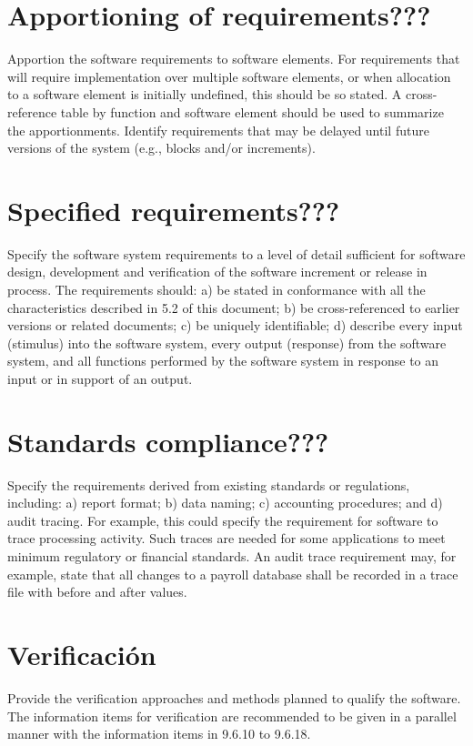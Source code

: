 \documentclass[12pt, a4paper, twoside]{article}
\begin{document}
 \section{Apportioning of requirements???}
 Apportion the software requirements to software elements. For requirements that will require
 implementation over multiple software elements, or when allocation to a software element is initially
 undefined, this should be so stated. A cross-reference table by function and software element should be
 used to summarize the apportionments.
 Identify requirements that may be delayed until future versions of the system (e.g., blocks and/or
 increments).

 \section{Specified requirements???}
 Specify the software system requirements to a level of detail sufficient for software design, development
 and verification of the software increment or release in process.
 The requirements should:
 a) be stated in conformance with all the characteristics described in 5.2 of this document;
 b) be cross-referenced to earlier versions or related documents;
 c) be uniquely identifiable;
 d) describe every input (stimulus) into the software system, every output (response) from the
 software system, and all functions performed by the software system in response to an input or in
 support of an output.

 \section{Standards compliance???}
 Specify the requirements derived from existing standards or regulations, including:
 a) report format;
 b) data naming;
 c) accounting procedures; and
 d) audit tracing.
 For example, this could specify the requirement for software to trace processing activity. Such traces
 are needed for some applications to meet minimum regulatory or financial standards. An audit trace
 requirement may, for example, state that all changes to a payroll database shall be recorded in a trace
 file with before and after values.

 \section{Verificación}
 Provide the verification approaches and methods planned to qualify the software. The information
 items for verification are recommended to be given in a parallel manner with the information items in
 9.6.10 to 9.6.18.
\end{document}
